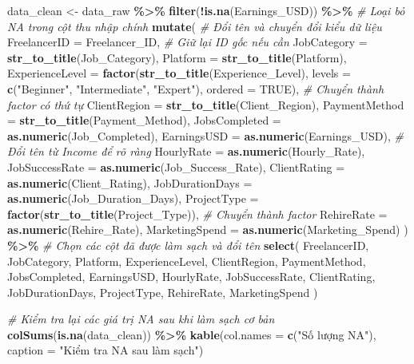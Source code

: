\documentclass[
]{article}
\newenvironment{Shaded}{\begin{snugshade}}{\end{snugshade}}
\newcommand{\AttributeTok}[1]{\textcolor[rgb]{0.13,0.29,0.53}{#1}}
\newcommand{\CommentTok}[1]{\textcolor[rgb]{0.56,0.35,0.01}{\textit{#1}}}
\newcommand{\ConstantTok}[1]{\textcolor[rgb]{0.56,0.35,0.01}{#1}}
\newcommand{\FunctionTok}[1]{\textcolor[rgb]{0.13,0.29,0.53}{\textbf{#1}}}
\newcommand{\NormalTok}[1]{#1}
\newcommand{\OtherTok}[1]{\textcolor[rgb]{0.56,0.35,0.01}{#1}}
\newcommand{\SpecialCharTok}[1]{\textcolor[rgb]{0.81,0.36,0.00}{\textbf{#1}}}
\newcommand{\StringTok}[1]{\textcolor[rgb]{0.31,0.60,0.02}{#1}}
\begin{document}
\begin{Shaded}
\begin{Highlighting}[]
\NormalTok{data\_clean }\OtherTok{\textless{}{-}}\NormalTok{ data\_raw }\SpecialCharTok{\%\textgreater{}\%}
  \FunctionTok{filter}\NormalTok{(}\SpecialCharTok{!}\FunctionTok{is.na}\NormalTok{(Earnings\_USD)) }\SpecialCharTok{\%\textgreater{}\%} \CommentTok{\# Loại bỏ NA trong cột thu nhập chính}
  \FunctionTok{mutate}\NormalTok{(}
    \CommentTok{\# Đổi tên và chuyển đổi kiểu dữ liệu}
    \AttributeTok{FreelancerID =}\NormalTok{ Freelancer\_ID, }\CommentTok{\# Giữ lại ID gốc nếu cần}
    \AttributeTok{JobCategory =} \FunctionTok{str\_to\_title}\NormalTok{(Job\_Category),}
    \AttributeTok{Platform =} \FunctionTok{str\_to\_title}\NormalTok{(Platform),}
    \AttributeTok{ExperienceLevel =} \FunctionTok{factor}\NormalTok{(}\FunctionTok{str\_to\_title}\NormalTok{(Experience\_Level), }\AttributeTok{levels =} \FunctionTok{c}\NormalTok{(}\StringTok{"Beginner"}\NormalTok{, }\StringTok{"Intermediate"}\NormalTok{, }\StringTok{"Expert"}\NormalTok{), }\AttributeTok{ordered =} \ConstantTok{TRUE}\NormalTok{), }\CommentTok{\# Chuyển thành factor có thứ tự}
    \AttributeTok{ClientRegion =} \FunctionTok{str\_to\_title}\NormalTok{(Client\_Region),}
    \AttributeTok{PaymentMethod =} \FunctionTok{str\_to\_title}\NormalTok{(Payment\_Method),}
    \AttributeTok{JobsCompleted =} \FunctionTok{as.numeric}\NormalTok{(Job\_Completed),}
    \AttributeTok{EarningsUSD =} \FunctionTok{as.numeric}\NormalTok{(Earnings\_USD), }\CommentTok{\# Đổi tên từ Income để rõ ràng}
    \AttributeTok{HourlyRate =} \FunctionTok{as.numeric}\NormalTok{(Hourly\_Rate),}
    \AttributeTok{JobSuccessRate =} \FunctionTok{as.numeric}\NormalTok{(Job\_Success\_Rate),}
    \AttributeTok{ClientRating =} \FunctionTok{as.numeric}\NormalTok{(Client\_Rating),}
    \AttributeTok{JobDurationDays =} \FunctionTok{as.numeric}\NormalTok{(Job\_Duration\_Days),}
    \AttributeTok{ProjectType =} \FunctionTok{factor}\NormalTok{(}\FunctionTok{str\_to\_title}\NormalTok{(Project\_Type)), }\CommentTok{\# Chuyển thành factor}
    \AttributeTok{RehireRate =} \FunctionTok{as.numeric}\NormalTok{(Rehire\_Rate),}
    \AttributeTok{MarketingSpend =} \FunctionTok{as.numeric}\NormalTok{(Marketing\_Spend)}
\NormalTok{  ) }\SpecialCharTok{\%\textgreater{}\%}
  \CommentTok{\# Chọn các cột đã được làm sạch và đổi tên}
  \FunctionTok{select}\NormalTok{(}
\NormalTok{    FreelancerID, JobCategory, Platform, ExperienceLevel, ClientRegion, PaymentMethod,}
\NormalTok{    JobsCompleted, EarningsUSD, HourlyRate, JobSuccessRate, ClientRating,}
\NormalTok{    JobDurationDays, ProjectType, RehireRate, MarketingSpend}
\NormalTok{  )}

\CommentTok{\# Kiểm tra lại các giá trị NA sau khi làm sạch cơ bản}
\FunctionTok{colSums}\NormalTok{(}\FunctionTok{is.na}\NormalTok{(data\_clean)) }\SpecialCharTok{\%\textgreater{}\%} \FunctionTok{kable}\NormalTok{(}\AttributeTok{col.names =} \FunctionTok{c}\NormalTok{(}\StringTok{"Số lượng NA"}\NormalTok{), }\AttributeTok{caption =} \StringTok{"Kiểm tra NA sau làm sạch"}\NormalTok{)}
\end{Highlighting}
\end{Shaded}
\end{document}
